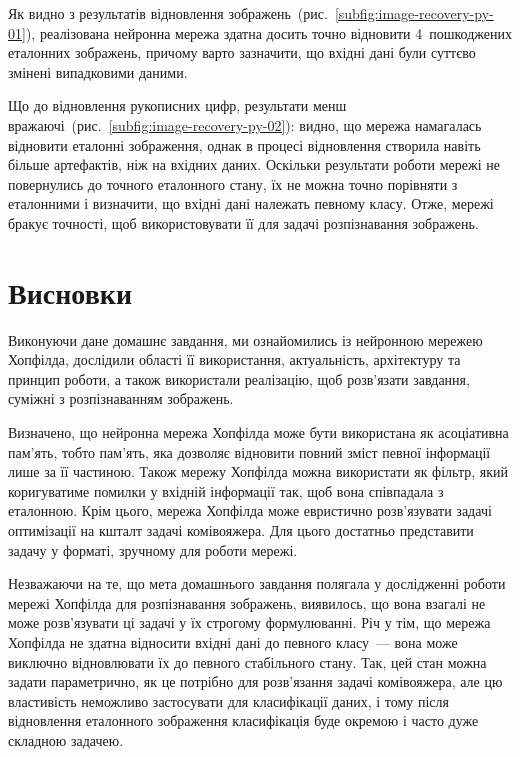 \documentclass[
  a4paper,
  oneside,
  BCOR = 10mm,
  DIV = 12,
  12pt,
  headings = normal,
]{scrartcl}
\begin{document}
    Як видно з результатів відновлення зображень~(рис.~\ref{subfig:image-recovery-py-01}), реалізована нейронна мережа здатна досить точно відновити 4~пошкоджених еталонних зображень, причому варто зазначити, що вхідні дані були суттєво змінені випадковими даними.

    Що до відновлення рукописних цифр, результати менш вражаючі~(рис.~\ref{subfig:image-recovery-py-02}): видно, що мережа намагалась відновити еталонні зображення, однак в процесі відновлення створила навіть більше артефактів, ніж на вхідних даних. Оскільки результати роботи мережі не повернулись до точного еталонного стану, їх не можна точно порівняти з еталонними і визначити, що вхідні дані належать певному класу. Отже, мережі бракує точності, щоб використовувати її для задачі розпізнавання зображень.

  \clearpage
  \section*{Висновки}
    Виконуючи дане домашнє завдання, ми ознайомились із нейронною мережею Хопфілда, дослідили області її використання, актуальність, архітектуру та принцип роботи, а також використали реалізацію, щоб розв'язати завдання, суміжні з розпізнаванням зображень.

    Визначено, що нейронна мережа Хопфілда може бути використана як асоціативна пам'ять, тобто пам'ять, яка дозволяє відновити повний зміст певної інформації лише за її частиною. Також мережу Хопфілда можна використати як фільтр, який коригуватиме помилки у вхідній інформації так, щоб вона співпадала з еталонною. Крім цього, мережа Хопфілда може евристично розв'язувати задачі оптимізації на кшталт задачі комівояжера. Для цього достатньо представити задачу у форматі, зручному для роботи мережі.

    Незважаючи на те, що мета домашнього завдання полягала у дослідженні роботи мережі Хопфілда для розпізнавання зображень, виявилось, що вона взагалі не може розв'язувати ці задачі у їх строгому формулюванні. Річ у тім, що мережа Хопфілда не здатна відносити вхідні дані до певного класу~— вона може виключно відновлювати їх до певного стабільного стану. Так, цей стан можна задати параметрично, як це потрібно для розв'язання задачі комівояжера, але цю властивість неможливо застосувати для класифікації даних, і тому після відновлення еталонного зображення класифікація буде окремою і часто дуже складною задачею.
\end{document}
